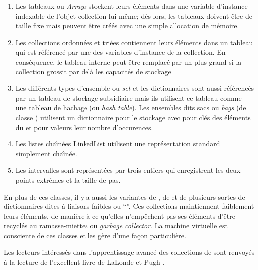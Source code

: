 \documentclass[a4paper,10pt,twoside]{book}
\begin{document}
\begin{enumerate}
  \item Les tableaux ou \emph{Arrays} stockent leurs \'el\'ements dans une
variable d'instance indexable de l'objet collection lui-m\^eme; 
d\`es lors, les tableaux doivent \^etre de taille fixe mais peuvent \^etre
cr\'e\'es avec une simple allocation de m\'emoire.
  \item Les collections ordonn\'ees  et tri\'ees 
 contiennent leurs \'el\'ements dans un tableau
qui est r\'ef\'erenc\'e par une des variables d'instance de la collection.
En cons\'equence, le tableau interne peut \^etre remplac\'e par un 
plus grand si la collection grossit par del\`a les capacit\'es de 
stockage.
  \item Les diff\'erents types d'ensemble ou \emph{set} et les dictionnaires
sont aussi r\'ef\'erenc\'es par un tableau de stockage subsidiaire
mais ils utilisent ce tableau comme une tableau de hachage (ou \emph{hash table}). Les ensembles dits sacs ou \emph{bags} (de classe ) utilisent
un dictionnaire  pour le stockage avec pour cl\'es
des \'el\'ements du  et pour valeurs leur nombre d'occurences.
  \item Les listes cha\^{\i}n\'ees LinkedList utilisent une
repr\'esentation standard simplement cha\^{\i}n\'ee.
  \item Les intervalles  sont repr\'esent\'ees 
par trois entiers qui enregistrent les deux points extr\^emes et la taille de pas.
\end{enumerate}
En plus de ces classes, il y a aussi 
les variantes de \mbox{,} de  et de plusieurs sortes de dictionnaires dites \`a liaisons faibles ou ``''. Ces collections
maintiennent faiblement leurs \'el\'ements, \ie
de mani\`ere \`a ce qu'elles n'emp\^echent pas ses \'el\'ements d'\^etre
recycl\'es au ramasse-miettes ou \emph{garbage collector}.
La machine virtuelle \sq est consciente de ces classes et les g\`ere d'une
fa\c{c}on particuli\`ere.

Les lecteurs int\'eress\'es dans l'apprentissage avanc\'e des collections
de \st sont renvoy\'es \`a la lecture de l'excellent livre de LaLonde et Pugh
\cite{LaLo90a}.
\end{document}
